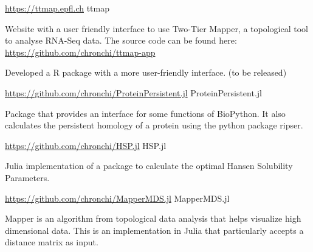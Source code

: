 

\begin{cventries}


\cventry
  {\url{https://ttmap.epfl.ch}} %
  {ttmap} %
  {}{}
  {
    \begin{cvitems} %
      \item {Website with a user friendly interface to use Two-Tier Mapper, a 
             topological tool to analyse RNA-Seq data. The source code can be
             found here: \url{https://github.com/chronchi/ttmap-app}}
      \item {Developed a R package with a more user-friendly interface. 
             (to be released)} 
    \end{cvitems}
  }



\cventry
  {\url{https://github.com/chronchi/ProteinPersistent.jl}} %
  {ProteinPersistent.jl} %
  {}{}
  {
    \begin{cvitems} %
      \item {Package that provides an interface for some functions of BioPython.
      It also calculates the persistent homology of a protein using the python
      package ripser.}
    \end{cvitems}
  }

\cventry
  {\url{https://github.com/chronchi/HSP.jl}} %
  {HSP.jl} %
  {}{}
  {
    \begin{cvitems} %
      \item {Julia implementation of a package to calculate the
      optimal Hansen Solubility Parameters.}
    \end{cvitems}
  }

\cventry
  {\url{https://github.com/chronchi/MapperMDS.jl}} %
  {MapperMDS.jl} %
  {}{}
  {
    \begin{cvitems} %
      \item {Mapper is an algorithm from topological data analysis that
      helps visualize high dimensional data. This is
      an implementation in Julia that particularly accepts a distance matrix
      as input.}
    \end{cvitems}
  }


\end{cventries}
